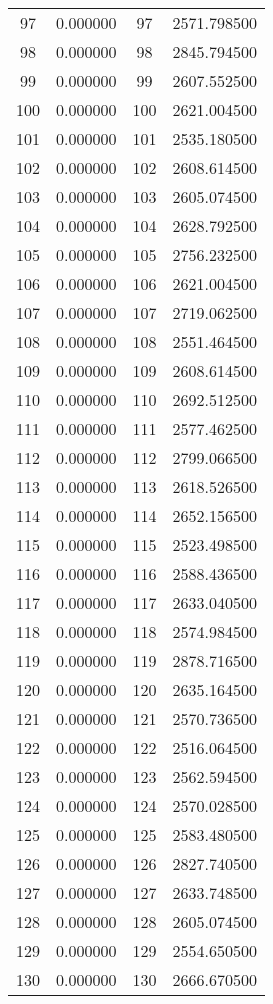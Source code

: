 \documentclass[12pt]{article}
\begin{document}
\begin{longtable}{@{}cccc@{}}
97 & 0.000000 & 97 & 2571.798500 \\
98 & 0.000000 & 98 & 2845.794500 \\
99 & 0.000000 & 99 & 2607.552500 \\
100 & 0.000000 & 100 & 2621.004500 \\
101 & 0.000000 & 101 & 2535.180500 \\
102 & 0.000000 & 102 & 2608.614500 \\
103 & 0.000000 & 103 & 2605.074500 \\
104 & 0.000000 & 104 & 2628.792500 \\
105 & 0.000000 & 105 & 2756.232500 \\
106 & 0.000000 & 106 & 2621.004500 \\
107 & 0.000000 & 107 & 2719.062500 \\
108 & 0.000000 & 108 & 2551.464500 \\
109 & 0.000000 & 109 & 2608.614500 \\
110 & 0.000000 & 110 & 2692.512500 \\
111 & 0.000000 & 111 & 2577.462500 \\
112 & 0.000000 & 112 & 2799.066500 \\
113 & 0.000000 & 113 & 2618.526500 \\
114 & 0.000000 & 114 & 2652.156500 \\
115 & 0.000000 & 115 & 2523.498500 \\
116 & 0.000000 & 116 & 2588.436500 \\
117 & 0.000000 & 117 & 2633.040500 \\
118 & 0.000000 & 118 & 2574.984500 \\
119 & 0.000000 & 119 & 2878.716500 \\
120 & 0.000000 & 120 & 2635.164500 \\
121 & 0.000000 & 121 & 2570.736500 \\
122 & 0.000000 & 122 & 2516.064500 \\
123 & 0.000000 & 123 & 2562.594500 \\
124 & 0.000000 & 124 & 2570.028500 \\
125 & 0.000000 & 125 & 2583.480500 \\
126 & 0.000000 & 126 & 2827.740500 \\
127 & 0.000000 & 127 & 2633.748500 \\
128 & 0.000000 & 128 & 2605.074500 \\
129 & 0.000000 & 129 & 2554.650500 \\
130 & 0.000000 & 130 & 2666.670500 \\

\end{longtable}
\end{document}

